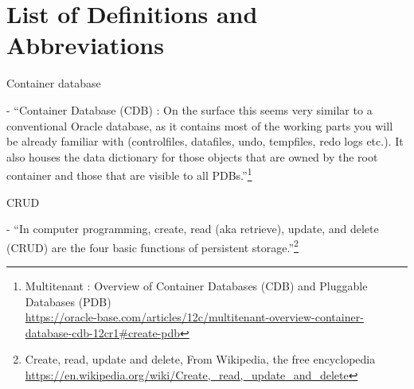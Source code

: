 

\newpage
\setcounter{secnumdepth}{0}
\section{List of Definitions and Abbreviations}

\noindent\begin{itemize*}

\item{\begin{bf}Container database\end{bf}} - ``Container Database (CDB) : On 
the surface this seems very similar to a conventional Oracle database, as it 
contains most of the working parts you will be already familiar with 
(controlfiles, datafiles, undo, tempfiles, redo logs etc.). It also houses 
the data dictionary for those objects that are owned by the root container 
and those that are visible to all PDBs.''\footnote{Multitenant : Overview of Container Databases (CDB) and Pluggable Databases (PDB)\\
\href{https://oracle-base.com/articles/12c/multitenant-overview-container-database-cdb-12cr1\#create-pdb}{https://oracle-base.com/articles/12c/multitenant-overview-container-database-cdb-12cr1\#create-pdb}}

\item{\begin{bf}CRUD\end{bf}} - ``In computer programming,
  create, read (aka retrieve), update, and delete (CRUD)
  are the four basic functions of persistent storage.''\footnote{Create, read, update and delete, From Wikipedia, the free encyclopedia\\
    \href{https://en.wikipedia.org/wiki/Create,\_read,\_update\_and\_delete}{https://en.wikipedia.org/wiki/Create,\_read,\_update\_and\_delete}}


\end{itemize*}
